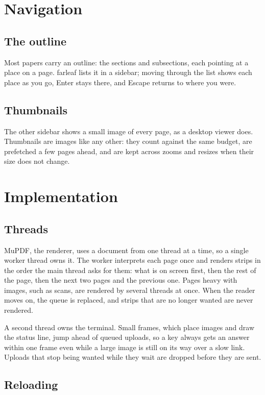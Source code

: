 \documentclass[12pt]{article}
\begin{document}
\section{Navigation}

\subsection{The outline}

Most papers carry an outline: the sections and subsections, each pointing at a
place on a page. farleaf lists it in a sidebar; moving through the list shows
each place as you go, Enter stays there, and Escape returns to where you were.

\subsection{Thumbnails}

The other sidebar shows a small image of every page, as a desktop viewer does.
Thumbnails are images like any other: they count against the same budget, are
prefetched a few pages ahead, and are kept across zooms and resizes when their
size does not change.

\section{Implementation}

\subsection{Threads}

MuPDF, the renderer, uses a document from one thread at a time, so a single
worker thread owns it. The worker interprets each page once and renders strips
in the order the main thread asks for them: what is on screen first, then the
rest of the page, then the next two pages and the previous one. Pages heavy
with images, such as scans, are rendered by several threads at once. When the
reader moves on, the queue is replaced, and strips that are no longer wanted
are never rendered.

A second thread owns the terminal. Small frames, which place images and draw
the status line, jump ahead of queued uploads, so a key always gets an answer
within one frame even while a large image is still on its way over a slow
link. Uploads that stop being wanted while they wait are dropped before they
are sent.

\subsection{Reloading}
\end{document}
